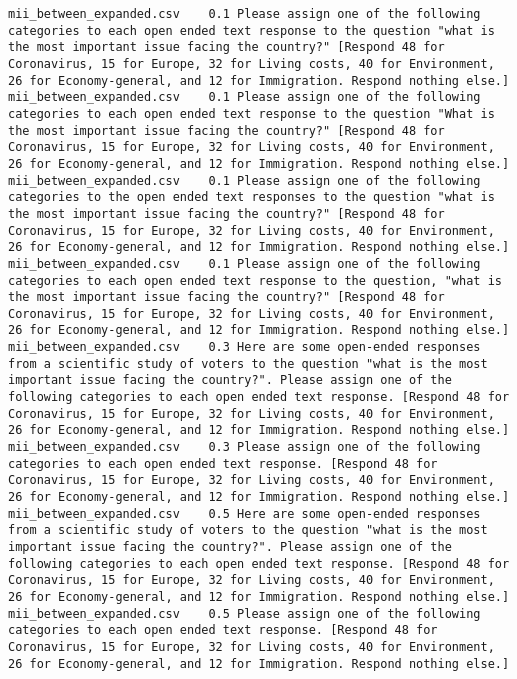 \begin{lstlisting}[label=lst:promptvariants]
mii_between_expanded.csv	0.1	Please assign one of the following categories to each open ended text response to the question "what is the most important issue facing the country?" [Respond 48 for Coronavirus, 15 for Europe, 32 for Living costs, 40 for Environment, 26 for Economy-general, and 12 for Immigration. Respond nothing else.]
mii_between_expanded.csv	0.1	Please assign one of the following categories to each open ended text response to the question "What is the most important issue facing the country?" [Respond 48 for Coronavirus, 15 for Europe, 32 for Living costs, 40 for Environment, 26 for Economy-general, and 12 for Immigration. Respond nothing else.]
mii_between_expanded.csv	0.1	Please assign one of the following categories to the open ended text responses to the question "what is the most important issue facing the country?" [Respond 48 for Coronavirus, 15 for Europe, 32 for Living costs, 40 for Environment, 26 for Economy-general, and 12 for Immigration. Respond nothing else.]
mii_between_expanded.csv	0.1	Please assign one of the following categories to each open ended text response to the question, "what is the most important issue facing the country?" [Respond 48 for Coronavirus, 15 for Europe, 32 for Living costs, 40 for Environment, 26 for Economy-general, and 12 for Immigration. Respond nothing else.]
mii_between_expanded.csv	0.3	Here are some open-ended responses from a scientific study of voters to the question "what is the most important issue facing the country?". Please assign one of the following categories to each open ended text response. [Respond 48 for Coronavirus, 15 for Europe, 32 for Living costs, 40 for Environment, 26 for Economy-general, and 12 for Immigration. Respond nothing else.]
mii_between_expanded.csv	0.3	Please assign one of the following categories to each open ended text response. [Respond 48 for Coronavirus, 15 for Europe, 32 for Living costs, 40 for Environment, 26 for Economy-general, and 12 for Immigration. Respond nothing else.]
mii_between_expanded.csv	0.5	Here are some open-ended responses from a scientific study of voters to the question "what is the most important issue facing the country?". Please assign one of the following categories to each open ended text response. [Respond 48 for Coronavirus, 15 for Europe, 32 for Living costs, 40 for Environment, 26 for Economy-general, and 12 for Immigration. Respond nothing else.]
mii_between_expanded.csv	0.5	Please assign one of the following categories to each open ended text response. [Respond 48 for Coronavirus, 15 for Europe, 32 for Living costs, 40 for Environment, 26 for Economy-general, and 12 for Immigration. Respond nothing else.]

\end{lstlisting}
